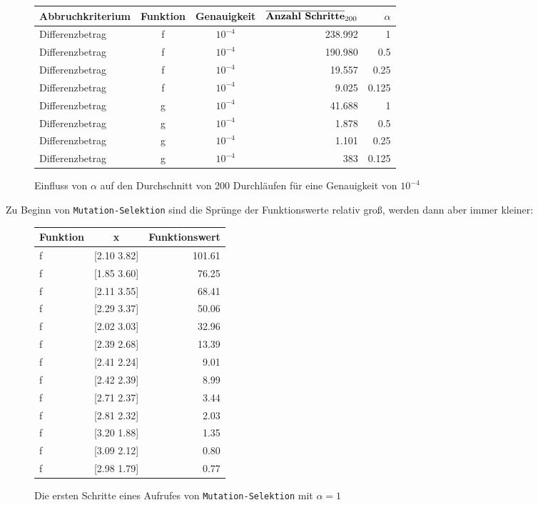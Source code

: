 \documentclass[a4paper, 12pt]{report}
\begin{document}
\begin{figure}[H]
  \centering
  \def\arraystretch{1.25}
  \begin{tabular}{l|c|c|r|r}
    \hline
    \textbf{Abbruchkriterium} & \textbf{Funktion} & \textbf{Genauigkeit} & $\overline{ \text{\textbf{Anzahl Schritte}} }_{200}$ & \textbf{$\alpha$}\\
    \hline
    Differenzbetrag & f & $10^{-4} $ & 238.992 & 1\\
    Differenzbetrag & f & $10^{-4} $ & 190.980 & 0.5\\
    Differenzbetrag & f & $10^{-4} $ & 19.557 & 0.25\\
    Differenzbetrag & f & $10^{-4} $ & 9.025 & 0.125\\
    Differenzbetrag & g & $10^{-4} $ & 41.688 & 1\\
    Differenzbetrag & g & $10^{-4} $ & 1.878 & 0.5\\
    Differenzbetrag & g & $10^{-4} $ & 1.101 & 0.25\\
    Differenzbetrag & g & $10^{-4} $ & 383 & 0.125\\
    \hline
  \end{tabular}
  \caption{Einfluss von $\alpha$ auf den Durchschnitt von 200 Durchläufen für eine Genauigkeit von $10^{-4}$}
\end{figure}

Zu Beginn von \lstinline[basicstyle=\ttfamily\color{black}]|Mutation-Selektion| sind die Sprünge der Funktionswerte relativ groß, werden dann aber
immer kleiner:

\begin{figure}[H]
  \centering
  \def\arraystretch{1.25}
  \begin{tabular}{l|c|r}
    \hline
    \textbf{Funktion} & \textbf{x} & \textbf{Funktionswert}\\
    \hline
    f & [2.10 3.82] & 101.61\\
    f & [1.85 3.60] & 76.25\\
    f & [2.11 3.55] & 68.41\\
    f & [2.29 3.37] & 50.06\\
    f & [2.02 3.03] & 32.96\\
    f & [2.39 2.68] & 13.39\\
    f & [2.41 2.24] & 9.01\\
    f & [2.42 2.39] & 8.99\\
    f & [2.71 2.37] & 3.44\\
    f & [2.81 2.32] & 2.03\\
    f & [3.20 1.88] & 1.35\\
    f & [3.09 2.12] & 0.80\\
    f & [2.98 1.79] & 0.77\\
    \hline
  \end{tabular}
  \caption{Die ersten Schritte eines Aufrufes von \lstinline[basicstyle=\ttfamily\color{black}]|Mutation-Selektion| mit $\alpha = 1$}
\end{figure}
\end{document}
